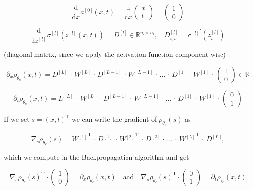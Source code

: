 \begin{equation*}
    \frac{\mathrm{d}}{\mathrm{d} x} a^{[0]}(x,t) = \frac{\mathrm{d}}{\mathrm{d} x} \begin{pmatrix} x \\ t \end{pmatrix} = \begin{pmatrix} 1 \\ 0 \end{pmatrix}
\end{equation*}

\begin{equation*}
    \frac{\mathrm{d}}{\mathrm{d} z^{[l]}} \sigma^{[l]} (z^{[l]}(x,t)) = D^{[l]} \in \mathbb{R}^{n_l \times n_l}, \quad D_{i, i}^{[l]} = {\sigma^{[l]}}^{\prime} (z_{i}^{[l]})
\end{equation*}

(diagonal matrix, since we apply the activation function component-wise)

\begin{equation*}
    \partial_x \rho_{\theta_e}(x, t) = D^{[L]} \, \cdot \, W^{[L]} \, \cdot \, D^{[L-1]} \, \cdot \, W^{[L-1]} \, \cdot \, \ldots \, \cdot \, D^{[1]} \, \cdot \, W^{[1]} \, \cdot \, \begin{pmatrix} 1 \\ 0 \end{pmatrix} \in \mathbb{R}
\end{equation*}

\begin{equation*}
    \partial_t \rho_{\theta_e}(x, t) = D^{[L]} \, \cdot \, W^{[L]} \, \cdot \, D^{[L-1]} \, \cdot \, W^{[L-1]} \, \cdot \, \ldots \, \cdot \, D^{[1]} \, \cdot \, W^{[1]} \, \cdot \, \begin{pmatrix} 0 \\ 1 \end{pmatrix} 
\end{equation*}

If we set $s = (x, t)^{\mathrm{T}}$ we can write the gradient of $\rho_{\theta_e}(s)$ as

\begin{equation*}
    \nabla_s \rho_{\theta_e}(s) = {W^{[1]}}^{\mathrm{T}} \, \cdot \, D^{[1]} \, \cdot \, {W^{[2]}}^{\mathrm{T}} \, \cdot \, D^{[2]} \, \cdot \, \ldots \, \cdot \, {W^{[L]}}^{\mathrm{T}} \, \cdot \, D^{[L]},
\end{equation*}

which we compute in the Backpropagation algorithm and get

\begin{equation*}
    {\nabla_s \rho_{\theta_e}(s)}^{\mathrm{T}} \cdot \begin{pmatrix} 1 \\ 0 \end{pmatrix} = \partial_x \rho_{\theta_e}(x, t) \quad \text{and} \quad {\nabla_s \rho_{\theta_e}(s)}^{\mathrm{T}} \cdot \begin{pmatrix} 0 \\ 1 \end{pmatrix} = \partial_t \rho_{\theta_e}(x, t)
\end{equation*}


